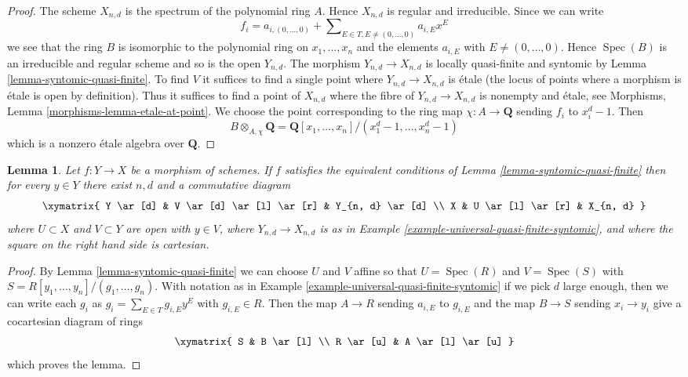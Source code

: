 \documentclass[10pt,a4paper]{amsart}
\theoremstyle{plain}
\newtheorem{lemma}[subsection]{Lemma}
\theoremstyle{definition}
\theoremstyle{remark}
\numberwithin{equation}{subsection}
\def\Spec{\mathop{\mathrm{Spec}}}
\begin{document}
\begin{proof}
The scheme $X_{n, d}$ is the spectrum of the polynomial ring $A$.
Hence $X_{n, d}$ is regular and irreducible. Since we can write
$$
f_i = a_{i, (0, \ldots, 0)} +
\sum\nolimits_{E \in T, E \not = (0, \ldots, 0)} a_{i, E} x^E
$$
we see that the ring $B$ is isomorphic to the polynomial ring
on $x_1, \ldots, x_n$ and the elements $a_{i, E}$ with
$E \not = (0, \ldots, 0)$. Hence $\Spec(B)$ is an irreducible and
regular scheme and so is the open $Y_{n, d}$. The morphism
$Y_{n, d} \to X_{n, d}$ is locally quasi-finite and syntomic by
Lemma \ref{lemma-syntomic-quasi-finite}. To find $V$ it suffices
to find a single point where $Y_{n, d} \to X_{n, d}$ is \'etale
(the locus of points where a morphism is \'etale is open by
definition). Thus it suffices to find a point of $X_{n, d}$
where the fibre of $Y_{n, d} \to X_{n, d}$ is nonempty and \'etale, see
Morphisms, Lemma \ref{morphisms-lemma-etale-at-point}. We choose
the point corresponding to the ring map $\chi : A \to \mathbf{Q}$
sending $f_i$ to $x_i^d - 1$. Then
$$
B \otimes_{A, \chi} \mathbf{Q} =
\mathbf{Q}[x_1, \ldots, x_n]/(x_1^d - 1, \ldots, x_n^d - 1)
$$
which is a nonzero \'etale algebra over $\mathbf{Q}$.
\end{proof}

\begin{lemma}
\label{lemma-locally-comes-from-universal}
Let $f : Y \to X$ be a morphism of schemes. If $f$ satisfies the equivalent
conditions of Lemma \ref{lemma-syntomic-quasi-finite} then for every
$y \in Y$ there exist $n, d$ and a commutative diagram
$$
\xymatrix{
Y \ar[d] &
V \ar[d] \ar[l] \ar[r] &
Y_{n, d} \ar[d] \\
X & U \ar[l] \ar[r] &
X_{n, d}
}
$$
where $U \subset X$ and $V \subset Y$ are open with $y \in V$,
where $Y_{n, d} \to X_{n, d}$
is as in Example \ref{example-universal-quasi-finite-syntomic}, and
where the square on the right hand side is cartesian.
\end{lemma}

\begin{proof}
By Lemma \ref{lemma-syntomic-quasi-finite}
we can choose $U$ and $V$ affine so that
$U = \Spec(R)$ and $V = \Spec(S)$ with
$S = R[y_1, \ldots, y_n]/(g_1, \ldots, g_n)$.
With notation as in Example \ref{example-universal-quasi-finite-syntomic}
if we pick $d$ large enough, then we can write each $g_i$ as
$g_i = \sum_{E \in T} g_{i, E}y^E$ with $g_{i, E} \in R$.
Then the map $A \to R$ sending $a_{i, E}$ to $g_{i, E}$
and the map $B \to S$ sending $x_i \to y_i$ give a cocartesian
diagram of rings
$$
\xymatrix{
S & B \ar[l] \\
R \ar[u] & A \ar[l] \ar[u]
}
$$
which proves the lemma.
\end{proof}
\end{document}
